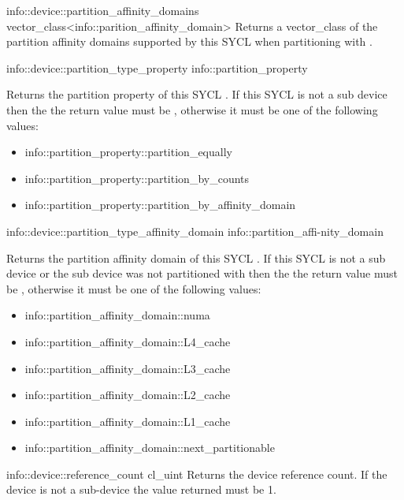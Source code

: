   \addInfoRow
  {info::device::partition_affinity_domains}
  {vector_class<info::parition_affini\-ty_domain>}
  {
  Returns a vector_class of the partition affinity domains supported by this SYCL  when partitioning with .
  }

  \addInfoRow
  {info::device::partition_type_property}
  {info::partition_prop\-erty}
  {
  Returns the partition property of this SYCL . If this SYCL  is not a sub device then the the return value must be , otherwise it must be one of the following values:
  \begin{itemize}
    \item info::partition_property::partition_equally
    \item info::partition_property::partition_by_counts
    \item info::partition_property::partition_by_affinity_domain
  \end{itemize}
  }
  
  \addInfoRow
  {info::device::partition_type_affinity_domain}
  {info::partition_affi-nity_domain}
  {
  Returns the partition affinity domain of this SYCL . If this SYCL  is not a sub device or the sub device was not partitioned with  then the the return value must be , otherwise it must be one of the following values:
  \begin{itemize}
    \item info::partition_affinity_domain::numa
    \item info::partition_affinity_domain::L4_cache
    \item info::partition_affinity_domain::L3_cache
    \item info::partition_affinity_domain::L2_cache
    \item info::partition_affinity_domain::L1_cache
    \item info::partition_affinity_domain::next_partitionable
  \end{itemize}
  }

  \addInfoRow
  {info::device::reference_count}
  {cl_uint}
  {
  Returns the device reference count. If the device is not a sub-device the value returned must be 1.
  }
\completeTable


